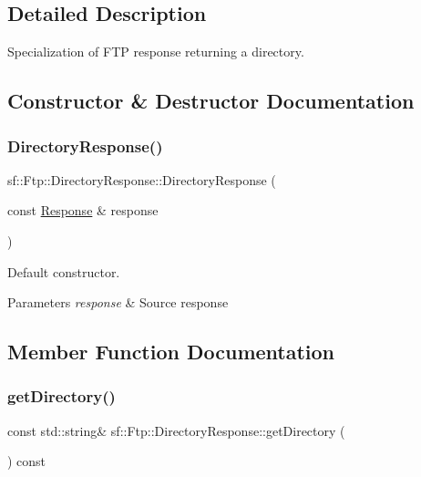\subsection{Detailed Description}
Specialization of F\+TP response returning a directory. 

\subsection{Constructor \& Destructor Documentation}
\mbox{\label{classsf_1_1_ftp_1_1_directory_response_a36b6d2728fa53c4ad37b7a6307f4d388}} 
\subsubsection{\texorpdfstring{Directory\+Response()}{DirectoryResponse()}}
{\footnotesize\ttfamily sf\+::\+Ftp\+::\+Directory\+Response\+::\+Directory\+Response (\begin{DoxyParamCaption}\item[{const \hyperlink{classsf_1_1_ftp_1_1_response}{Response} \&}]{response }\end{DoxyParamCaption})}



Default constructor. 


\begin{DoxyParams}{Parameters}
{\em response} & Source response \\
\hline
\end{DoxyParams}


\subsection{Member Function Documentation}
\mbox{\label{classsf_1_1_ftp_1_1_directory_response_a311575c5c50905219025acfa73de67e2}} 
\subsubsection{\texorpdfstring{get\+Directory()}{getDirectory()}}
{\footnotesize\ttfamily const std\+::string\& sf\+::\+Ftp\+::\+Directory\+Response\+::get\+Directory (\begin{DoxyParamCaption}{ }\end{DoxyParamCaption}) const}



